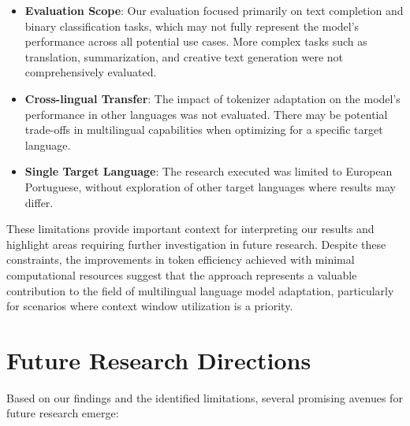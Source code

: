 \begin{itemize}
    \item \textbf{Evaluation Scope}: Our evaluation focused primarily on text completion and binary classification tasks, which may not fully represent the model's performance across all potential use cases. More complex tasks such as translation, summarization, and creative text generation were not comprehensively evaluated.
    
    \item \textbf{Cross-lingual Transfer}: The impact of tokenizer adaptation on the model's performance in other languages was not evaluated. There may be potential trade-offs in multilingual capabilities when optimizing for a specific target language.

    \item \textbf{Single Target Language}: The research executed was limited to European Portuguese, without exploration of other target languages where results may differ.
\end{itemize}

These limitations provide important context for interpreting our results and highlight areas requiring further investigation in future research. Despite these constraints, the improvements in token efficiency achieved with minimal computational resources suggest that the approach represents a valuable contribution to the field of multilingual language model adaptation, particularly for scenarios where context window utilization is a priority.

\section{Future Research Directions}
Based on our findings and the identified limitations, several promising avenues for future research emerge:

